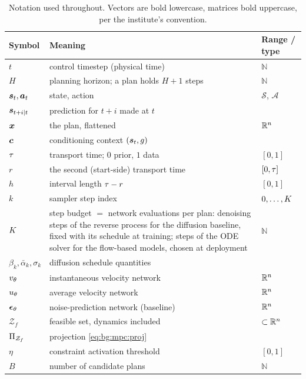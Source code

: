 \begin{table}[htpb]
  \caption[Notation]{Notation used throughout. Vectors are bold lowercase, matrices bold
  uppercase, per the institute's convention.}
  \centering
  \label{tab:notation}
  \begin{tabularx}{\linewidth}{lLl}
    \toprule
    Symbol & Meaning & Range / type \\
    \midrule
    $t$ & control timestep (physical time) & $\mathbb{N}$ \\
    $H$ & planning horizon; a plan holds $H+1$ steps & $\mathbb{N}$ \\
    $\boldsymbol{s}_{t},\boldsymbol{a}_{t}$ & state, action & $\mathcal{S}$, $\mathcal{A}$ \\
    $\boldsymbol{s}_{t+i|t}$ & prediction for $t+i$ made at $t$ & \\
    $\boldsymbol{x}$ & the plan, flattened & $\mathbb{R}^{n}$ \\
    $\boldsymbol{c}$ & conditioning context $(\boldsymbol{s}_{t},g)$ & \\
    $\tau$ & transport time; $0$ prior, $1$ data & $[0,1]$ \\
    $r$ & the second (start-side) transport time & $[0,\tau]$ \\
    $h$ & interval length $\tau-r$ & $[0,1]$ \\
    $k$ & sampler step index & $0,\dots,K$ \\
    $K$ & step budget $=$ network evaluations per plan: denoising steps of the reverse process
      for the diffusion baseline, fixed with its schedule at training; steps of the \ac{ODE} solver
      for the flow-based models, chosen at deployment & $\mathbb{N}$ \\
    $\beta_{k},\bar{\alpha}_{k},\sigma_{k}$ & diffusion schedule quantities & \\
    $v_{\theta}$ & instantaneous velocity network & $\mathbb{R}^{n}$ \\
    $u_{\theta}$ & average velocity network & $\mathbb{R}^{n}$ \\
    $\boldsymbol{\epsilon}_{\theta}$ & noise-prediction network (baseline) & $\mathbb{R}^{n}$ \\
    $\mathcal{Z}_{f}$ & feasible set, dynamics included & $\subset\mathbb{R}^{n}$ \\
    $\Pi_{\mathcal{Z}_{f}}$ & projection \eqref{eq:bg:mpc:proj} & \\
    $\eta$ & constraint activation threshold & $[0,1]$ \\
    $B$ & number of candidate plans & $\mathbb{N}$ \\

\end{tabularx}
\end{table}
